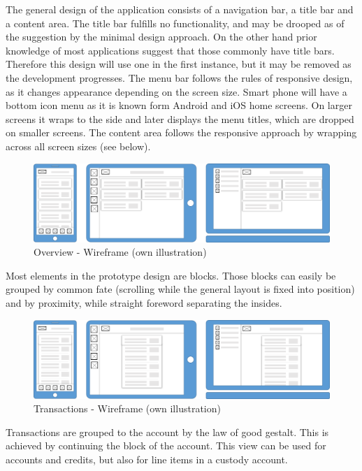 The general design of the application consists of a navigation bar, a title bar and a content area. The title bar fulfills no functionality, and may be drooped as of the suggestion by the minimal design approach. On the other hand prior knowledge of most applications suggest that those commonly have title bars. Therefore this design will use one in the first instance, but it may be removed as the development progresses. The menu bar follows the rules of responsive design, as it changes appearance depending on the screen size. Smart phone will have a bottom icon menu as it is known form Android and iOS home screens. On larger screens it wraps to the side and later displays the menu titles, which are dropped on smaller screens. The content area follows the responsive approach by wrapping across all screen sizes (see below).
\begin{figure}[H]
    \centering
    \includegraphics[width=\textwidth]{img/diagrams/wireframes/overview.png}
    \caption[Overview - Wireframe]{Overview - Wireframe (own illustration)}
    \label{fig:}
\end{figure}
Most elements in the prototype design are blocks. Those blocks can easily be grouped by common fate (scrolling while the general layout is fixed into position) and by proximity, while straight foreword separating the insides.
\begin{figure}[H]
    \centering
    \includegraphics[width=\textwidth]{img/diagrams/wireframes/transaction.png}
    \caption[Transactions - Wireframe]{Transactions - Wireframe (own illustration)}
    \label{fig:}
\end{figure}
Transactions are grouped to the account by the law of good gestalt. This is achieved by continuing the block of the account. This view can be used for accounts and credits, but also for line items in a custody account.
